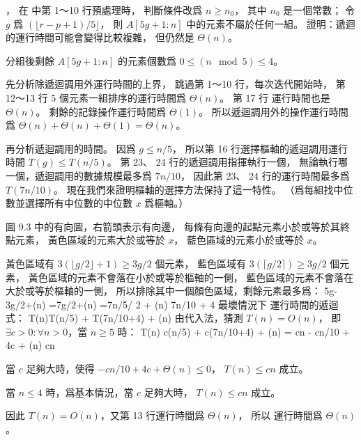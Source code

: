 \startEXERCISE，
在  中第 1～10 行預處理時，
判斷條件改爲 $n\ge n_0$，
其中 $n_0$ 是一個常數；
令 $g$ 爲 $(\lfloor r-p+1)/5\rfloor$，
則 $A[5g+1:n]$ 中的元素不屬於任何一組。
證明：遞迴的運行時間可能會變得比較複雜，
但仍然是 $\Theta(n)$。
\stopEXERCISE

\startANSWER
分組後剩餘 $A[5g+1:n]$ 的元素個數爲 $0\le(n\mod 5)\le 4$。

先分析除遞迴調用外運行時間的上界，
跳過第 1～10 行，每次迭代開始時，
第 12～13 行 $5$ 個元素一組排序的運行時間爲 $\Theta(n)$。
第 17 行  運行時間也是 $\Theta(n)$。
剩餘的記錄操作運行時間爲 $\Theta(1)$。
所以遞迴調用外的操作運行時間爲
 $\Theta(n)+\Theta(n)+\Theta(1)=\Theta(n)$。

再分析遞迴調用的時間。
因爲 $g\le n/5$，
所以第 16 行選擇樞軸的遞迴調用運行時間 $T(g)\le T(n/5)$。
第 23、 24 行的遞迴調用指揮執行一個，
無論執行哪一個，遞迴調用的數據規模最多爲 $7n/10$，
因此第 23、 24 行的運行時間最多爲 $T(7n/10)$。
現在我們來證明樞軸的選擇方法保持了這一特性。
（爲每組找中位數並選擇所有中位數的中位數 $x$ 爲樞軸。）

圖 9.3 中的有向圖，右箭頭表示有向邊，
每條有向邊的起點元素小於或等於其終點元素，
黃色區域的元素大於或等於 $x$，
藍色區域的元素小於或等於 $x$。

黃色區域有 $3(\lfloor g/2\rfloor +1)\ge 3g/2$ 個元素，
藍色區域有 $3(\lceil g/2\rceil)\ge 3g/2$ 個元素，
黃色區域的元素不會落在小於或等於樞軸的一側，
藍色區域的元素不會落在大於或等於樞軸的一側，
所以排除其中一個顏色區域，剩餘元素最多爲：
\startformula
5g-3g/2+(n)
  =7g/2+(n)
  =7\lfloor n/5\rfloor / 2 + (n)
  \le 7n/10 + 4
\stopformula
最壞情況下  運行時間的遞迴式：
\startformula
T(n)\le T(n/5) + T(7n/10+4) + \Theta(n)
\stopformula
由代入法，猜測 $T(n)=O(n)$，
即 $\exists c>0: \forall n>0$，當 $n\ge 5$ 時：
\startformula\startmathalignment
\NC T(n)
   \NC \le c(n/5) + c(7n/10+4) + \Theta(n) \NR
\NC\NC = cn - cn/10 + 4c + \Theta(n) \NR
\NC\NC \le cn \NR
\stopmathalignment\stopformula

當 $c$ 足夠大時，使得 $-cn/10+4c+\Theta(n)\le 0$，
 $T(n)\le cn$ 成立。

當 $n\le 4$ 時，爲基本情況，當 $c$ 足夠大時， $T(n)\le cn$ 成立。

因此 $T(n)=O(n)$，又第 13 行運行時間爲 $\Theta(n)$，
所以  運行時間爲 $\Theta(n)$。
\stopANSWER
